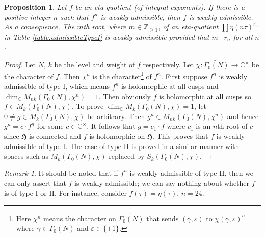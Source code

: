 \documentclass[12pt]{amsart}
\numberwithin{equation}{section}
\theoremstyle{plain}
\newtheorem{prop}[thm]{Proposition}
\theoremstyle{definition}
\theoremstyle{remark}
\newtheorem{rema}[thm]{Remark}
\newcommand\numC{\mathbb{C}}
\newcommand\numgeq[2]{\mathbb{#1}_{\geq #2}}
\newcommand\uhp{\mathfrak{H}}
\begin{document}
\begin{prop}
Let $f$ be an eta-quotient (of integral exponents). If there is a positive integer $n$ such that $f^n$ is weakly admissible, then $f$ is weakly admissible. As a consequence, The $m$th root, where $m\in\numgeq{Z}{1}$, of an eta-quotient $\prod\eta(n\tau)^{r_n}$ in Table \ref{table:admissibleTypeI} is weakly admissible provided that $m\mid r_n$ for all $n$.
\end{prop}
\begin{proof}
Let $N$, $k$ be the level and weight of $f$ respectively. Let $\chi\colon\widetilde{\Gamma_0(N)}\rightarrow\numC^\times$ be the character of $f$. Then $\chi^n$ is the character\footnote{Here $\chi^n$ means the character on $\widetilde{\Gamma_0(N)}$ that sends $\left(\gamma,\varepsilon\right)$ to $\chi\left(\gamma,\varepsilon\right)^n$ where $\gamma\in\Gamma_0(N)$ and $\varepsilon\in\{\pm1\}$.} of $f^n$. First suppose $f^n$ is weakly admissible of type I, which means $f^n$ is holomorphic at all cusps and $\dim_\numC M_{nk}(\Gamma_0(N),\chi^n)=1$. Then obviously $f$ is holomorphic at all cusps so $f\in M_{k}(\Gamma_0(N),\chi)$. To prove $\dim_\numC M_{k}(\Gamma_0(N),\chi)=1$, let $0\neq g\in M_{k}(\Gamma_0(N),\chi)$ be arbitrary. Then $g^n\in M_{nk}(\Gamma_0(N),\chi^n)$ and hence $g^n=c\cdot f^n$ for some $c\in\numC^\times$. It follows that $g=c_1\cdot f$ where $c_1$ is an $n$th root of $c$ since $\uhp$ is connected and $f$ is holomorphic on $\uhp$. This proves that $f$ is weakly admissible of type I. The case of type II is proved in a similar manner with spaces such as $M_{k}(\Gamma_0(N),\chi)$ replaced by $S_{k}(\Gamma_0(N),\chi)$.
\end{proof}
\begin{rema}
It should be noted that if $f^n$ is weakly admissible of type II, then we can only assert that $f$ is weakly admissible; we can say nothing about whether $f$ is of type I or II. For instance, consider $f(\tau)=\eta(\tau)$, $n=24$.
\end{rema}
\end{document}
